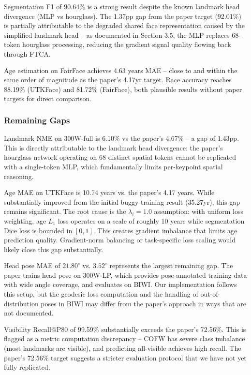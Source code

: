 \documentclass[11pt]{article}
\begin{document}
Segmentation F1 of 90.64\% is a strong result despite the known landmark head divergence (MLP vs hourglass). The 1.37pp gap from the paper target (92.01\%) is partially attributable to the degraded shared face representation caused by the simplified landmark head -- as documented in Section 3.5, the MLP replaces 68-token hourglass processing, reducing the gradient signal quality flowing back through FTCA.

Age estimation on FairFace achieves 4.63 years MAE -- close to and within the same order of magnitude as the paper's 4.17yr target. Race accuracy reaches 88.19\% (UTKFace) and 81.72\% (FairFace), both plausible results without paper targets for direct comparison.



\subsubsection{Remaining Gaps}

Landmark NME on 300W-full is 6.10\% vs the paper's 4.67\% -- a gap of 1.43pp. This is directly attributable to the landmark head divergence: the paper's hourglass network operating on 68 distinct spatial tokens cannot be replicated with a single-token MLP, which fundamentally limits per-keypoint spatial reasoning.

Age MAE on UTKFace is 10.74 years vs. the paper's 4.17 years. While substantially improved from the initial buggy training result (35.27yr), this gap remains significant. The root cause is the $\lambda_i=1.0$ assumption: with uniform loss weighting, age $L_1$ loss operates on a scale of roughly 10 years while segmentation Dice loss is bounded in $[0,1]$. This creates gradient imbalance that limits age prediction quality. Gradient-norm balancing or task-specific loss scaling would likely close this gap substantially.

Head pose MAE of $21.80^\circ$ vs. $3.52^\circ$ represents the largest remaining gap. The paper trains head pose on 300W-LP, which provides pose-annotated training data with wide angle coverage, and evaluates on BIWI. Our implementation follows this setup, but the geodesic loss computation and the handling of out-of-distribution poses in BIWI may differ from the paper's approach in ways that are not documented.

Visibility Recall@P80 of 99.59\% substantially exceeds the paper's 72.56\%. This is flagged as a metric computation discrepancy -- COFW has severe class imbalance (most landmarks are visible), and predicting all-visible achieves high recall. The paper's 72.56\% target suggests a stricter evaluation protocol that we have not yet fully replicated.
\end{document}
